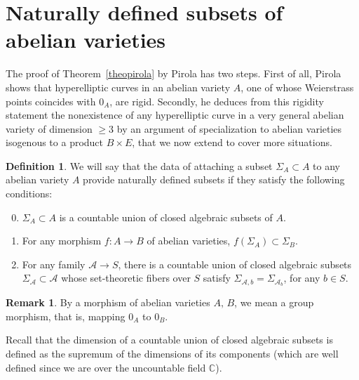 \documentclass[11pt]{article}
\theoremstyle{definition}
\newtheorem{defi}[theo]{Definition}
\newtheorem{rema}[theo]{Remark}
\numberwithin{equation}{section}
\numberwithin{figure}{section}
\numberwithin{table}{section}
\begin{document}
\section{Naturally defined subsets of abelian varieties}\label{secpirola}

The proof of Theorem~\ref{theopirola} by Pirola has two steps. First of all, Pirola shows that hyperelliptic curves in an abelian variety $A$, one of whose Weierstrass points coincides with $0_A$, are rigid. Secondly, he deduces from this rigidity statement the nonexistence of any hyperelliptic curve in a very general abelian variety of dimension $\geq 3$ by an argument of specialization to abelian varieties isogenous to a product $B\times E$, that we now extend to cover more situations.

\begin{defi}\label{definat}
We will say that the data of attaching a subset $\Sigma_A\subset A$ to any abelian variety $A$ provide naturally defined subsets if they satisfy
the following conditions:
\begin{enumerate}\setcounter{enumi}{-1}
\item \label{2.1.0} $\Sigma_A\subset A$ is a countable union of closed algebraic subsets of $A$.
\item \label{2.1.1} For any morphism $f:A\rightarrow B$ of abelian varieties, $f(\Sigma_A)\subset \Sigma_B$.
\item \label{2.1.2} For any family $\mathcal{A}\rightarrow S$, there is a countable union of closed algebraic subsets $\Sigma_{\mathcal{A}}\subset \mathcal{A}$ whose set-theoretic fibers over $S$ satisfy $\Sigma_{\mathcal{A},b}=\Sigma_{\mathcal{A}_b}$, for any $b\in S$.
\end{enumerate}
\end{defi}

\begin{rema}
By a morphism of abelian varieties $A,\,B$, we mean a group morphism, that is, mapping $0_A$ to $0_B$.
\end{rema}

Recall that the dimension of a countable union of closed algebraic subsets is defined as the supremum of the dimensions of its components (which are well defined since we are over the uncountable field $ \mathbb{C}$).
\end{document}

